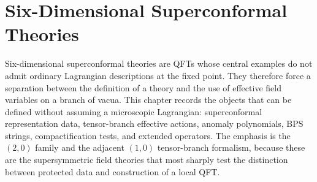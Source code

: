 \chapter{Six-Dimensional Superconformal Theories}
\label{ch:susy-six-dimensional-scft}

\ConventionsMixed

Six-dimensional superconformal theories are QFTs whose central examples do
not admit ordinary Lagrangian descriptions at the fixed point.  They
therefore force a separation between the definition of a theory and the use
of effective field variables on a branch of vacua.  This chapter records the
objects that can be defined without assuming a microscopic Lagrangian:
superconformal representation data, tensor-branch effective actions, anomaly
polynomials, BPS strings, compactification tests, and extended operators.
The emphasis is the \((2,0)\) family and the adjacent \((1,0)\) tensor-branch
formalism, because these are the supersymmetric field theories that most
sharply test the distinction between protected data and construction of a
local QFT.

